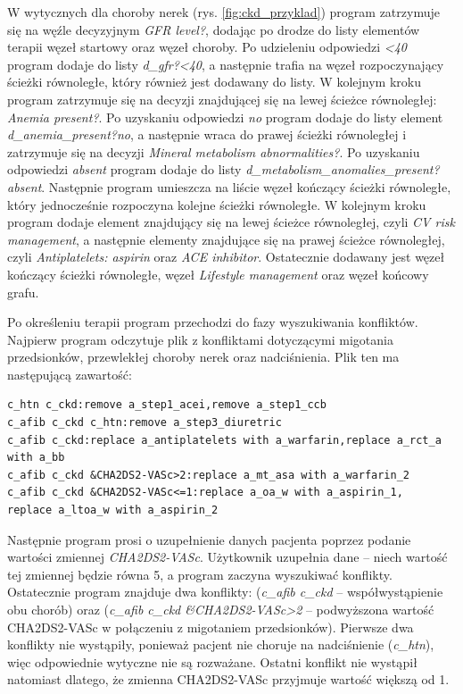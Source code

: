 W wytycznych dla choroby nerek (rys. \ref{fig:ckd_przyklad}) program zatrzymuje się na węźle decyzyjnym \textit{GFR level?}, dodając po drodze do listy elementów terapii węzeł startowy oraz węzeł choroby. Po udzieleniu odpowiedzi \textit{<40} program dodaje do listy \textit{d\_gfr?<40}, a następnie trafia na węzeł rozpoczynający ścieżki równoległe, który również jest dodawany do listy. W kolejnym kroku program zatrzymuje się na  decyzji znajdującej się na lewej ścieżce równoległej: \textit{Anemia present?}. Po uzyskaniu odpowiedzi \textit{no} program dodaje do listy element \textit{d\_anemia\_present?no}, a następnie wraca do prawej ścieżki równoległej i zatrzymuje się na decyzji \textit{Mineral metabolism abnormalities?}. Po uzyskaniu odpowiedzi \textit{absent} program dodaje do listy \textit{d\_metabolism\_anomalies\_present?absent}. Następnie program umieszcza na liście węzeł kończący ścieżki równoległe, który jednocześnie rozpoczyna kolejne ścieżki równoległe. W kolejnym kroku program dodaje element znajdujący się na lewej ścieżce równoległej, czyli \textit{CV risk management}, a następnie elementy znajdujące się na prawej ścieżce równoległej, czyli \textit{Antiplatelets: aspirin} oraz \textit{ACE inhibitor}. Ostatecznie dodawany jest węzeł kończący ścieżki równoległe, węzeł \textit{Lifestyle management} oraz węzeł końcowy grafu.

Po określeniu terapii program przechodzi do fazy wyszukiwania konfliktów. Najpierw program odczytuje plik z konfliktami dotyczącymi migotania przedsionków, przewlekłej choroby nerek oraz nadciśnienia. Plik ten ma następującą zawartość:
\begin{verbatim}
c_htn c_ckd:remove a_step1_acei,remove a_step1_ccb
c_afib c_ckd c_htn:remove a_step3_diuretric
c_afib c_ckd:replace a_antiplatelets with a_warfarin,replace a_rct_a with a_bb
c_afib c_ckd &CHA2DS2-VASc>2:replace a_mt_asa with a_warfarin_2
c_afib c_ckd &CHA2DS2-VASc<=1:replace a_oa_w with a_aspirin_1,
replace a_ltoa_w with a_aspirin_2
\end{verbatim}
Następnie program prosi o uzupełnienie danych pacjenta poprzez podanie wartości zmiennej \textit{CHA2\-DS2-VASc}. Użytkownik uzupełnia dane -- niech wartość tej zmiennej będzie równa 5, a program zaczyna wyszukiwać konflikty. Ostatecznie program znajduje dwa konflikty: (\textit{c\_afib c\_ckd} -- współwystąpienie obu chorób) oraz (\textit{c\_afib c\_ckd \&CHA2DS2-VASc>2} -- podwyższona wartość CHA2DS2-VASc w połączeniu z migotaniem przedsionków). Pierwsze dwa konflikty nie wystąpiły, ponieważ pacjent nie choruje na nadciśnienie (\textit{c\_htn}), więc odpowiednie wytyczne nie są rozważane. Ostatni konflikt nie wystąpił natomiast dlatego, że zmienna CHA2DS2-VASc przyjmuje wartość większą od 1.

